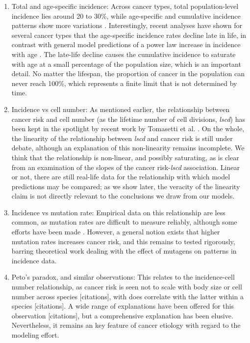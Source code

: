 \documentclass[9pt,twocolumn,twoside]{pnas-new}
\begin{document}
\begin{enumerate}
	\item Total and age-specific incidence: Across cancer types, total population-level incidence lies around 20 to 30\%, while age-specific and cumulative incidence patterns show more variations \cite{AmericanCancerSociety2016}. Interestingly, recent analyses have shown for several cancer types that the age-specific incidence rates decline late in life, in contrast with general model predictions of a power law increase in incidence with age \cite{Harding2012}. The late-life decline causes the cumulative incidence to saturate with age at a small percentage of the population size, which is an important detail. No matter the lifespan, the proportion of cancer in the population can never reach 100\%, which represents a finite limit that is not determined by time.
	\item Incidence vs cell number: As mentioned earlier, the relationship between cancer risk and cell number (as the lifetime number of cell divisions, \textit{lscd}) has been kept in the spotlight by recent work by Tomasetti et al. \cite{Tomasetti78, Tomasetti2017}. On the whole, the linearity of the relationship between \textit{lscd} and cancer risk is still under debate, although an explanation of this non-linearity remains incomplete. We think that the relationship is non-linear, and possibly saturating, as is clear from an examination of the slopes of the cancer risk-\textit{lscd} association. Linear or not, there are still real-life data for the relationship with which model predictions may be compared; as we show later, the veracity of the linearity claim is not directly relevant to the conclusions we draw from our models.
	\item Incidence vs mutation rate: Empirical data on this relationship are less common, as mutation rates are difficult to measure reliably, although some efforts have been made \cite{Hao2016}. However, a general notion exists that higher mutation rates increases cancer risk, and this remains to tested rigorously, barring theoretical work dealing with the effect of mutagens on patterns in incidence data.
	\item Peto's paradox, and similar observations: This relates to the incidence-cell number relationship, as cancer risk is seen not to scale with body size or cell number across species [citations], with does correlate with the latter within a species [citations]. A wide range of explanations have been offered for this observation [citations], but a comprehensive explanation has been elusive. Nevertheless, it remains an key feature of cancer etiology with regard to the modeling effort.

\end{enumerate}
\end{document}
